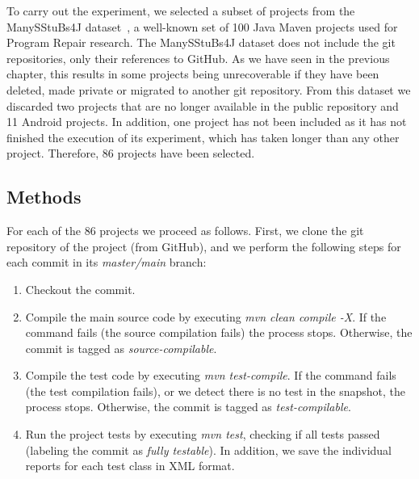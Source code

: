 
To carry out the experiment, we selected a subset of projects from the ManySStuBs4J dataset~\cite{karampatsis2020often}, a well-known set of 100 Java Maven projects used for Program Repair research.
The ManySStuBs4J dataset does not include the git repositories, only their references to GitHub. 
As we have seen in the previous chapter, this results in some projects being unrecoverable if they have been deleted, made private or migrated to another git repository.
From this dataset we discarded two projects that are no longer available in the public repository and 11 Android projects. 
In addition, one project has not been included as it has not finished the execution of its experiment, which has taken longer than any other project.
Therefore, 86 projects have been selected.

\subsection{Methods}
\label{subsec:methods}

For each of the 86 projects we proceed as follows. 
First, we clone the git repository of the project (from GitHub), and we perform the following steps for each commit in its \textit{master/main} branch:

\begin{enumerate}
    \item Checkout the commit.
    \item Compile the main source code by executing \textit{mvn clean compile -X}. If the command fails (the source compilation fails) the process stops. Otherwise, the commit is tagged as \textit{source-compilable}.
    \item Compile the test code by executing \textit{mvn test-compile}. If the command fails (the test compilation fails), or we detect there is no test in the snapshot, the process stops. Otherwise, the commit is tagged as \textit{test-compilable}.
    \item Run the project tests by executing \textit{mvn test}, checking if all tests passed (labeling the commit as \textit{fully testable}).
    In addition, we save the individual reports for each test class in XML format.
\end{enumerate}

